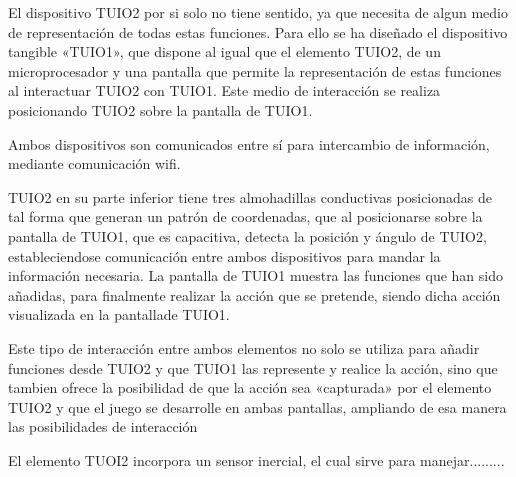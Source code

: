 El dispositivo TUIO2 por si solo no tiene sentido, ya que necesita de algun medio de representación de todas estas funciones. Para ello se ha diseñado el dispositivo tangible «TUIO1», que dispone al igual que el elemento TUIO2, de un microprocesador y una pantalla que permite la representación de estas funciones al interactuar TUIO2 con TUIO1. Este medio de interacción se realiza posicionando TUIO2 sobre la pantalla de TUIO1.

Ambos dispositivos son comunicados entre sí para intercambio de información, mediante comunicación wifi.

TUIO2 en su parte inferior tiene tres almohadillas conductivas posicionadas de tal forma que generan un patrón de coordenadas, que al posicionarse sobre la pantalla de TUIO1, que es capacitiva, detecta la posición y ángulo de TUIO2, estableciendose comunicación entre ambos dispositivos para mandar la información necesaria. La pantalla de TUIO1 muestra las funciones que han sido añadidas, para finalmente realizar la acción que se pretende, siendo dicha acción visualizada en la pantallade TUIO1.

Este tipo de interacción entre ambos elementos no solo se utiliza para añadir funciones desde TUIO2 y que TUIO1 las represente y realice la acción, sino que tambien ofrece la posibilidad de que la acción sea «capturada» por el elemento TUIO2 y que el juego se desarrolle en ambas pantallas, ampliando de esa manera las posibilidades de interacción

El elemento TUOI2 incorpora un sensor inercial, el cual sirve para manejar.........






